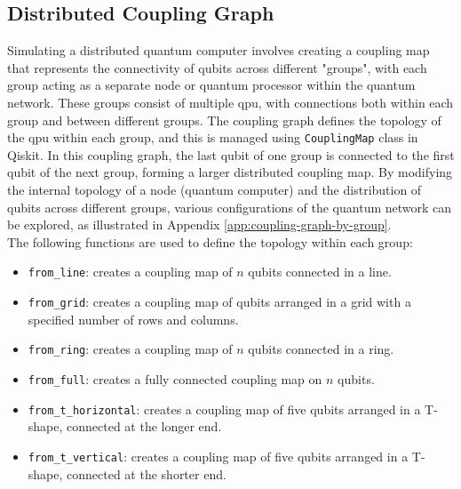 \subsection{Distributed Coupling Graph} %
Simulating a distributed quantum computer involves creating a coupling map that represents the connectivity of qubits across different "groups", with each group acting as a separate node or quantum processor within the quantum network. These groups consist of multiple \acrfull{qpu}, with connections both within each group and between different groups. The coupling graph defines the topology of the \acrshort{qpu} within each group, and this is managed using \lstinline{CouplingMap} \cite{ibmquantum_couplingmap} class in Qiskit. In this coupling graph, the last qubit of one group is connected to the first qubit of the next group, forming a larger distributed coupling map. By modifying the internal topology of a node (quantum computer) and the distribution of qubits across different groups, various configurations of the quantum network can be explored, as illustrated in Appendix \ref{app:coupling-graph-by-group}. \\
The following functions are used to define the topology within each group:
\begin{itemize}[nolistsep]
    \item \lstinline{from_line}: creates a coupling map of $n$ qubits connected in a line.
    \item \lstinline{from_grid}: creates a coupling map of qubits arranged in a grid with a specified number of rows and columns.
    \item \lstinline{from_ring}: creates a coupling map of $n$ qubits connected in a ring.
    \item \lstinline{from_full}: creates a fully connected coupling map on $n$ qubits.
    \item \lstinline{from_t_horizontal}: creates a coupling map of five qubits arranged in a T-shape, connected at the longer end.
    \item \lstinline{from_t_vertical}: creates a coupling map of five qubits arranged in a T-shape, connected at the shorter end.
\end{itemize}

